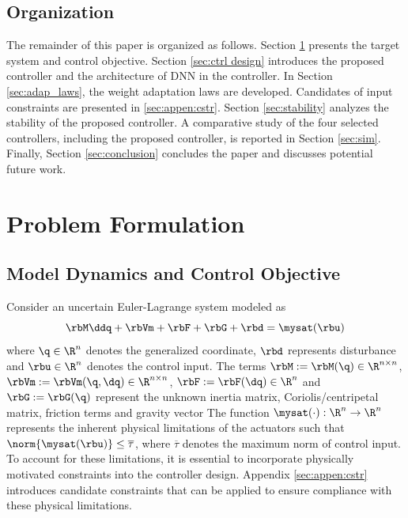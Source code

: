 \documentclass[final,5p,times,twocolumn,authoryear]{elsarticle}
\begin{document}
\subsection{Organization}

The remainder of this paper is organized as follows. 
Section \ref{sec:Problem Formulation} presents the target system and control objective.
Section \ref{sec:ctrl design} introduces the proposed controller and the architecture of DNN in the controller. 
In Section \ref{sec:adap_laws}, the weight adaptation laws are developed.
Candidates of input constraints are presented in \ref{sec:appen:cstr}.
Section \ref{sec:stability} analyzes the stability of the proposed controller.
A comparative study of the four selected controllers, including the proposed controller, is reported in Section \ref{sec:sim}.
Finally, Section \ref{sec:conclusion} concludes the paper and discusses potential future work.

\section{Problem Formulation}\label{sec:Problem Formulation}

\subsection{Model Dynamics and Control Objective}

Consider an uncertain Euler-Lagrange system modeled as
\begin{equation}
    \rbM\ddq + \rbVm + \rbF + \rbG + \rbd
    =
    \mysat(\rbu)
    \label{eq:sys1}
\end{equation}
where $\q\in \R^n$ denotes the generalized coordinate, $\rbd$ represents disturbance and $\rbu\in\R^n$ denotes the control input. 
The terms $\rbM:=\rbM(\q)\in\R^{n\times n}$, $\rbVm:=\rbVm(\q,\dq)\in\R^{n\times n}$, $\rbF:=\rbF(\dq)\in\R^{n}$ and $\rbG:=\rbG(\q)$ represent the unknown inertia matrix, Coriolis/centripetal matrix, friction terms and gravity vector
The function $\mysat(\cdot):\R^n\to\R^n$ represents the inherent physical limitations of the actuators such that $\norm{\mysat(\rbu)}\le \overline\tau$, where $\overline\tau$ denotes the maximum norm of control input.
To account for these limitations, it is essential to incorporate physically motivated constraints into the controller design.
Appendix \ref{sec:appen:cstr} introduces candidate constraints that can be applied to ensure compliance with these physical limitations.
\end{document}
